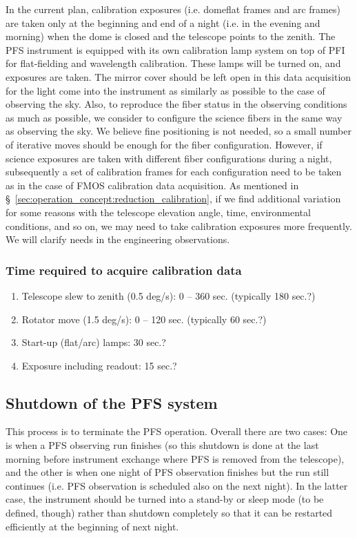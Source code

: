 \documentclass[a4paper]{article}
\begin{document}
In the current plan, calibration exposures (i.e. domeflat frames and
arc frames) are taken only at the beginning and end of a night
(i.e. in the evening and morning) when the dome is closed and the
telescope points to the zenith. The PFS instrument is equipped with
its own calibration lamp system on top of PFI for flat-fielding and
wavelength calibration. These lamps will be turned on, and exposures
are taken. The mirror cover should be left open in this data
acquisition for the light come into the instrument as similarly as
possible to the case of observing the sky. Also, to reproduce the
fiber status in the observing conditions as much as possible, we
consider to configure the science fibers in the same way as observing
the sky. We believe fine positioning is not needed, so a small number
of iterative moves should be enough for the fiber configuration.
However, if science exposures are taken with different fiber
configurations during a night, subsequently a set of calibration
frames for each configuration need to be taken as in the case of FMOS
calibration data acquisition. As mentioned in
\S~\ref{sec:operation_concept:reduction_calibration}, if we find additional variation
for some reasons with the telescope elevation angle, time,
environmental conditions, and so on, we may need to take calibration
exposures more frequently. We will clarify needs in the engineering
observations.

\subsubsection{Time required to acquire calibration data}

\begin{enumerate}
\item Telescope slew to zenith (0.5 deg/s): 0 -- 360 sec. (typically 180 sec.?)
\item Rotator move (1.5 deg/s): 0 -- 120 sec. (typically 60 sec.?)
\item Start-up (flat/arc) lamps: 30 sec.?
\item Exposure including readout: 15 sec.?
\end{enumerate}

\subsection{Shutdown of the PFS system\label{sec:detail_ope_plan:shutdown}}

This process is to terminate the PFS operation. Overall there are two
cases: One is when a PFS observing run finishes (so this shutdown is
done at the last morning before instrument exchange where PFS is
removed from the telescope), and the other is when one night of PFS
observation finishes but the run still continues (i.e. PFS observation
is scheduled also on the next night). In the latter case, the
instrument should be turned into a stand-by or sleep mode (to be
defined, though) rather than shutdown completely so that it can be
restarted efficiently at the beginning of next night.
\end{document}
